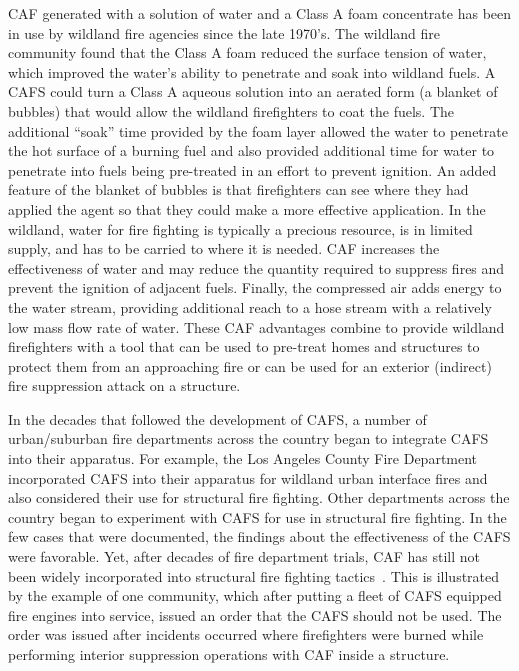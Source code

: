 \documentclass[12pt,oneside]{book}
\begin{document}
CAF generated with a solution of water and a Class A foam concentrate has been in use by wildland fire agencies since the late 1970's. The wildland fire community found that the Class A foam reduced the surface tension of water, which improved the water's ability to penetrate and soak into wildland fuels. A CAFS could turn a Class A aqueous solution into an aerated form (a blanket of bubbles) that would allow the wildland firefighters to coat the fuels. The additional ``soak'' time provided by the foam layer allowed the water to penetrate the hot surface of a burning fuel and also provided additional time for water to penetrate into fuels being pre-treated in an effort to prevent ignition. An added feature of the blanket of bubbles is that firefighters can see where they had applied the agent so that they could make a more effective application. In the wildland, water for fire fighting is typically a precious resource, is in limited supply, and has to be carried to where it is needed. CAF increases the effectiveness of water and may reduce the quantity required to suppress fires and prevent the ignition of adjacent fuels. Finally, the compressed air adds energy to the water stream, providing additional reach to a hose stream with a relatively low mass flow rate of water. These CAF advantages combine to provide wildland firefighters with a tool that can be used to pre-treat homes and structures to protect them from an approaching fire or can be used for an exterior (indirect) fire suppression attack on a structure.

In the decades that followed the development of CAFS, a number of urban/suburban fire departments across the country began to integrate CAFS into their apparatus. For example, the Los Angeles County Fire Department incorporated CAFS into their apparatus for wildland urban interface fires and also considered their use for structural fire fighting. Other departments across the country began to experiment with CAFS for use in structural fire fighting. In the few cases that were documented, the findings about the effectiveness of the CAFS were favorable. Yet, after decades of fire department trials, CAF has still not been widely incorporated into structural fire fighting tactics~\cite{USFA:CAFS,Lorh:2002}. This is illustrated by the example of one community, which after putting a fleet of CAFS equipped fire engines into service, issued an order that the CAFS should not be used. The order was issued after incidents occurred where firefighters were burned while performing interior suppression operations with CAF inside a structure.
\end{document}
